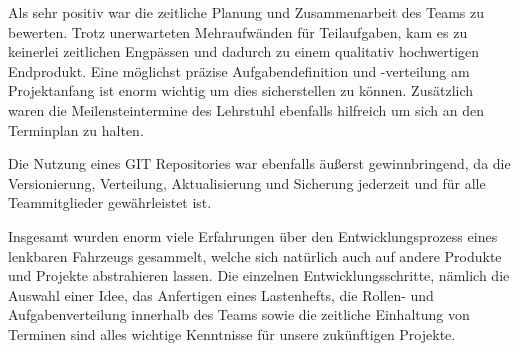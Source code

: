 Als sehr positiv war die zeitliche Planung und Zusammenarbeit des Teams zu bewerten. Trotz unerwarteten Mehraufwänden für Teilaufgaben, kam es zu keinerlei zeitlichen Engpässen und dadurch zu einem qualitativ hochwertigen Endprodukt. Eine möglichst präzise Aufgabendefinition und -verteilung am Projektanfang ist enorm wichtig um dies sicherstellen zu können. Zusätzlich waren die Meilensteintermine des Lehrstuhl ebenfalls hilfreich um sich an den Terminplan zu halten.

Die Nutzung eines GIT Repositories war ebenfalls äußerst gewinnbringend, da die Versionierung, Verteilung, Aktualisierung und Sicherung jederzeit und für alle Teammitglieder gewährleistet ist. 

Insgesamt wurden enorm viele Erfahrungen über den Entwicklungsprozess eines lenkbaren Fahrzeugs gesammelt, welche sich natürlich auch auf andere Produkte und Projekte abstrahieren lassen. Die einzelnen Entwicklungsschritte, nämlich die Auswahl einer Idee, das Anfertigen eines Lastenhefts, die Rollen- und Aufgabenverteilung innerhalb des Teams sowie die zeitliche Einhaltung von Terminen sind alles wichtige Kenntnisse für unsere zukünftigen Projekte.
